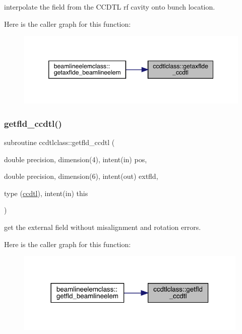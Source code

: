 interpolate the field from the C\+C\+D\+TL rf cavity onto bunch location. 

Here is the caller graph for this function\+:\nopagebreak
\begin{figure}[H]
\begin{center}
\leavevmode
\includegraphics[width=346pt]{namespaceccdtlclass_adb7b1c30d3fcb087a5064911ccd4fd1d_icgraph}
\end{center}
\end{figure}
\mbox{\label{namespaceccdtlclass_a62eb43f6a732d52951d468e91a2312cb}} 
\subsubsection{\texorpdfstring{getfld\_ccdtl()}{getfld\_ccdtl()}}
{\footnotesize\ttfamily subroutine ccdtlclass\+::getfld\+\_\+ccdtl (\begin{DoxyParamCaption}\item[{double precision, dimension(4), intent(in)}]{pos,  }\item[{double precision, dimension(6), intent(out)}]{extfld,  }\item[{type (\mbox{\hyperlink{namespaceccdtlclass_structccdtlclass_1_1ccdtl}{ccdtl}}), intent(in)}]{this }\end{DoxyParamCaption})}



get the external field without misalignment and rotation errors. 

Here is the caller graph for this function\+:\nopagebreak
\begin{figure}[H]
\begin{center}
\leavevmode
\includegraphics[width=314pt]{namespaceccdtlclass_a62eb43f6a732d52951d468e91a2312cb_icgraph}
\end{center}
\end{figure}
\mbox{\label{namespaceccdtlclass_ab81d1b262943e405eebe3bfef401bb97}} 
